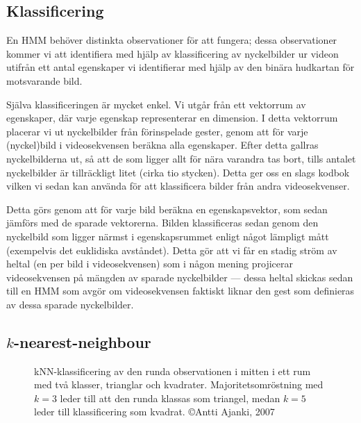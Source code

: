 \documentclass[../rapport_MVEX01-11-05]{subfiles}
\begin{document}
\subsection{Klassificering}
En HMM behöver distinkta observationer för att fungera; dessa
observationer kommer vi att identifiera med hjälp av klassificering av
nyckelbilder ur videon utifrån ett antal egenskaper vi identifierar
med hjälp av den binära hudkartan för motsvarande bild.

Själva klassificeringen är mycket enkel. Vi utgår från ett vektorrum
av egenskaper, där varje egenskap representerar en dimension. I detta
vektorrum placerar vi ut nyckelbilder från förinspelade gester, genom
att för varje (nyckel)bild i videosekvensen beräkna alla egenskaper.
Efter detta gallras nyckelbilderna ut, så att de som ligger allt för
nära varandra tas bort, tills antalet nyckelbilder är tillräckligt
litet (cirka tio stycken).
Detta ger oss en slags kodbok vilken vi sedan kan använda för att
klassificera bilder från andra videosekvenser. 


Detta görs genom att för varje bild beräkna en egenskapsvektor, som
sedan jämförs med de sparade vektorerna. Bilden klassificeras sedan
genom den nyckelbild som ligger närmst i egenskapsrummet enligt något
lämpligt mått (exempelvis det euklidiska avståndet). Detta gör att vi
får en stadig ström av heltal (en per bild i videosekvensen) som i
någon mening projicerar videosekvensen på mängden av sparade
nyckelbilder --- dessa heltal skickas sedan till en HMM som avgör om
videosekvensen faktiskt liknar den gest som definieras av dessa
sparade nyckelbilder.

\subsection{$k$-nearest-neighbour}

%

\begin{figure}[!htpb]
    \begin{center}
    \end{center}
    \caption{kNN-klassificering av den runda observationen i mitten i ett rum
    med två klasser, trianglar och kvadrater. Majoritetsomröstning
    med $k=3$ leder till att den runda klassas som triangel, medan $k=5$ leder
    till klassificering som kvadrat. \copyright Antti Ajanki, 2007}
    \label{fig:knn-overview}
\end{figure}
\end{document}
